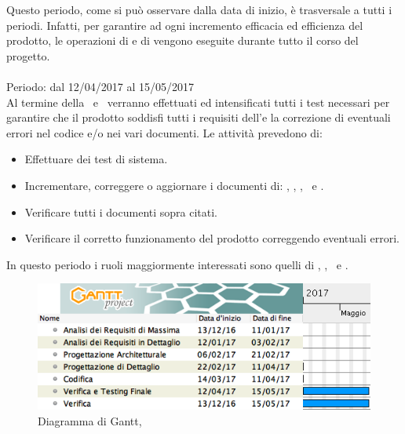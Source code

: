 Questo periodo, come si può osservare dalla data di inizio, è trasversale a tutti i periodi. Infatti, per garantire ad ogni incremento efficacia ed efficienza del prodotto, le operazioni di  e di  vengono eseguite durante tutto il corso del progetto.\\

\paragraph{\VV}
Periodo: dal 12/04/2017 al 15/05/2017 \\

Al termine della \PD\ e \COD\ verranno effettuati ed intensificati tutti i test necessari per garantire che il prodotto soddisfi tutti i requisiti dell'\AdR e la correzione di eventuali errori nel codice e/o nei vari documenti.
Le attività prevedono di:
\begin{itemize}
	\item Effettuare dei test di sistema.
	\item Incrementare, correggere o aggiornare i documenti di: \MU, \NdP, \PdP, \PdQ\ e \Gl.
	\item Verificare tutti i documenti sopra citati.
	\item Verificare il corretto funzionamento del prodotto correggendo eventuali errori.
\end{itemize}
In questo periodo i ruoli maggiormente interessati sono quelli di \Ver, \Prog, \Am\ e \Pm.

 \begin{figure}[H]
	\centering 
	\includegraphics[scale=0.5]{Immagini/Gantt/VV.png}
	\caption{Diagramma di Gantt, \VV}
\end{figure}
